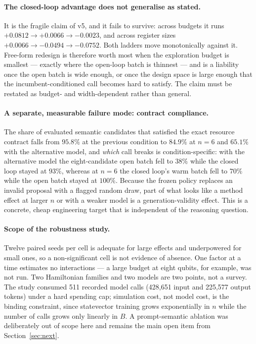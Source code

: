 \documentclass[11pt]{article}
\begin{document}
\paragraph{The closed-loop advantage does not generalise as stated.}
It is the fragile claim of v5, and it fails to survive: across budgets it runs
$+0.0812 \to +0.0066 \to -0.0023$, and across register sizes
$+0.0066 \to -0.0494 \to -0.0752$.
Both ladders move monotonically against it.
Free-form redesign is therefore worth most when the exploration budget is
smallest --- exactly where the open-loop batch is thinnest --- and is a
liability once the open batch is wide enough, or once the design space is large
enough that the incumbent-conditioned call becomes hard to satisfy.
The claim must be restated as budget- and width-dependent rather than general.

\paragraph{A separate, measurable failure mode: contract compliance.}
The share of evaluated semantic candidates that satisfied the exact resource
contract falls from $95.8\%$ at the previous condition to $84.9\%$ at $n=6$ and
$65.1\%$ with the alternative model, and \emph{which} call breaks is
condition-specific: with the alternative model the eight-candidate open batch
fell to $38\%$ while the closed loop stayed at $93\%$, whereas at $n=6$ the
closed loop's warm batch fell to $70\%$ while the open batch stayed at $100\%$.
Because the frozen policy replaces an invalid proposal with a flagged random
draw, part of what looks like a method effect at larger $n$ or with a weaker
model is a generation-validity effect.
This is a concrete, cheap engineering target that is independent of the
reasoning question.

\paragraph{Scope of the robustness study.}
Twelve paired seeds per cell is adequate for large effects and underpowered for
small ones, so a non-significant cell is not evidence of absence.
One factor at a time estimates no interactions --- a large budget at eight
qubits, for example, was not run.
Two Hamiltonian families and two models are two points, not a survey.
The study consumed 511 recorded model calls (428{,}651 input and 225{,}577
output tokens) under a hard spending cap; simulation cost, not model cost, is
the binding constraint, since statevector training grows exponentially in $n$
while the number of calls grows only linearly in $B$.
A prompt-semantic ablation was deliberately out of scope here and remains the
main open item from Section~\ref{sec:next}.
\end{document}
